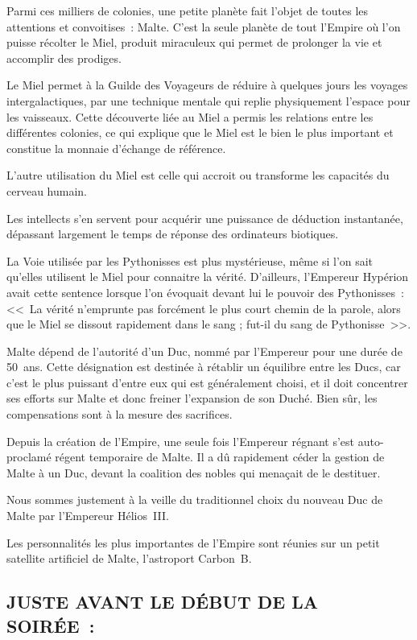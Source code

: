 \documentclass[14pt,twocolumn]{extarticle}
\begin{document}
Parmi ces milliers de colonies, une petite planète fait l'objet de toutes les
attentions et convoitises~: Malte. C'est la seule planète de tout l'Empire où
l'on puisse récolter le Miel, produit miraculeux qui permet de prolonger la vie
et accomplir des prodiges.

Le Miel permet à la Guilde des Voyageurs de réduire à quelques jours les
voyages intergalactiques, par une technique mentale qui replie physiquement
l'espace pour les vaisseaux. Cette découverte liée au Miel a permis les
relations entre les différentes colonies, ce qui explique que le Miel est le
bien le plus important et constitue la monnaie d'échange de référence.

L'autre utilisation du Miel est celle qui accroit ou transforme les capacités
du cerveau humain.

Les intellects s'en servent pour acquérir une puissance de déduction
instantanée, dépassant largement le temps de réponse des ordinateurs biotiques.

La Voie utilisée par les Pythonisses est plus mystérieuse, même si l'on sait
qu'elles utilisent le Miel pour connaitre la vérité. D'ailleurs, l'Empereur
Hypérion avait cette sentence lorsque l'on évoquait devant lui le pouvoir des
Pythonisses~: <<~La vérité n'emprunte pas forcément le plus court chemin de la
parole, alors que le Miel se dissout rapidement dans le sang ; fut-il du
sang de Pythonisse~>>.

Malte dépend de l'autorité d'un Duc, nommé par l'Empereur pour une durée de
50~ans. Cette désignation est destinée à rétablir un équilibre entre les Ducs,
car c'est le plus puissant d'entre eux qui est généralement choisi, et il doit
concentrer ses efforts sur Malte et donc freiner l'expansion de son Duché.
Bien sûr, les compensations sont à la mesure des sacrifices.

Depuis la création de l'Empire, une seule fois l'Empereur régnant s'est
auto-proclamé régent temporaire de Malte. Il a dû rapidement céder la gestion
de Malte à un Duc, devant la coalition des nobles qui menaçait de le destituer.

Nous sommes justement à la veille du traditionnel choix du nouveau Duc de Malte
par l'Empereur Hélios~III.

Les personnalités les plus importantes de l'Empire sont réunies sur un petit
satellite artificiel de Malte, l'astroport Carbon~B.

\subsection{JUSTE AVANT LE DÉBUT DE LA SOIRÉE~:}
\end{document}
